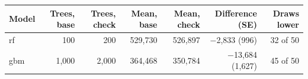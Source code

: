 \begin{tabular}{lrrrrrr}
\toprule
Model & Trees, base & Trees, check & Mean, base & Mean, check & Difference (SE) & Draws lower \\
\midrule
rf & 100 & 200 & 529,730 & 526,897 & $-$2,833 (996) & 32 of 50 \\
gbm & 1,000 & 2,000 & 364,468 & 350,784 & $-$13,684 (1,627) & 45 of 50 \\
\bottomrule
\end{tabular}
